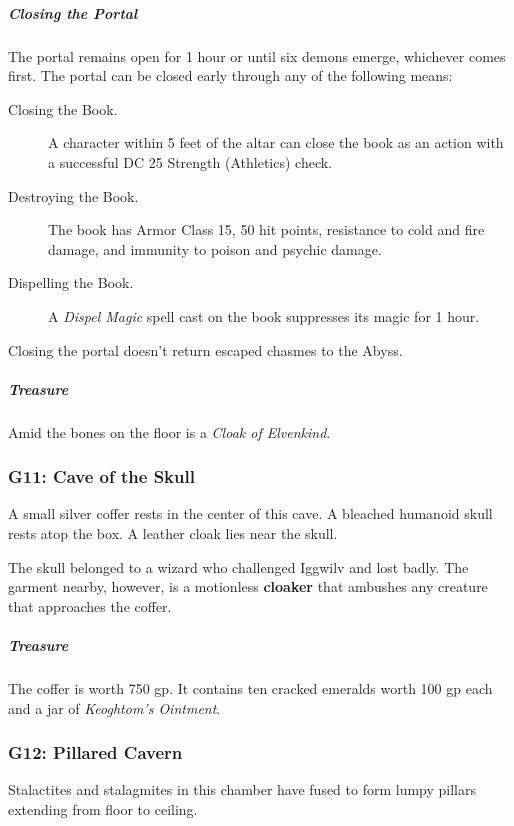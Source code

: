 \documentclass[10pt,a4paper,twoside,bg=print,twocolumn,openany,nodeprecatedcode]{dndbook}
\begin{document}
\subparagraph{Closing the Portal}
The portal remains open for 1 hour or until six demons emerge, whichever comes first. The portal can be closed early through any of the following means:


\begin{description}
\item[Closing the Book.]
A character within 5 feet of the altar can close the book as an action with a successful DC 25 Strength (Athletics) check.
\item[Destroying the Book.]
The book has Armor Class 15, 50 hit points, resistance to cold and fire damage, and immunity to poison and psychic damage.
\item[Dispelling the Book.]
A \textit{Dispel Magic} spell cast on the book suppresses its magic for 1 hour.
\end{description}

Closing the portal doesn't return escaped chasmes to the Abyss.

\subparagraph{Treasure}
Amid the bones on the floor is a \textit{Cloak of Elvenkind}.

\subsubsection{G11: Cave of the Skull}
\begin{DndReadAloud}{}
A small silver coffer rests in the center of this cave. A bleached humanoid skull rests atop the box. A leather cloak lies near the skull.

\end{DndReadAloud}

The skull belonged to a wizard who challenged Iggwilv and lost badly. The garment nearby, however, is a motionless \textbf{cloaker} that ambushes any creature that approaches the coffer.

\subparagraph{Treasure}
The coffer is worth 750 gp. It contains ten cracked emeralds worth 100 gp each and a jar of \textit{Keoghtom's Ointment}.

\subsubsection{G12: Pillared Cavern}
\begin{DndReadAloud}{}
Stalactites and stalagmites in this chamber have fused to form lumpy pillars extending from floor to ceiling.

\end{DndReadAloud}
\end{document}
